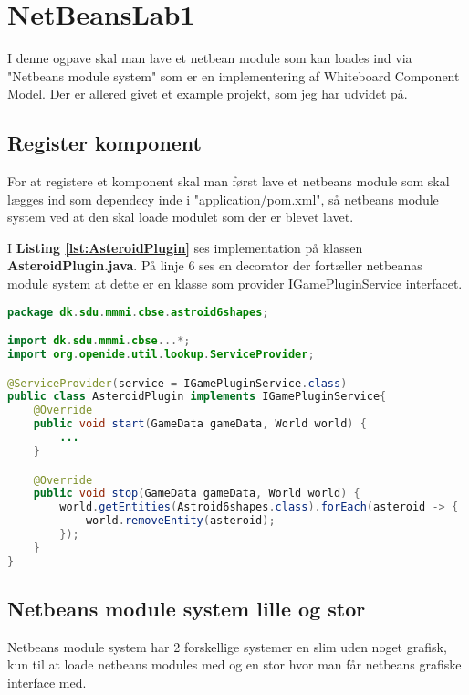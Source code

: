 \section{NetBeansLab1}
I denne ogpave skal man lave et netbean module som kan loades ind via
"Netbeans module system" som er en implementering af Whiteboard Component
Model. Der er allered givet et example projekt, som jeg har udvidet på.

\subsection{Register komponent}
For at registere et komponent skal man først lave et netbeans module som skal
lægges ind som dependecy inde i "application/pom.xml", så netbeans module
system ved at den skal loade modulet som der er blevet lavet.

\hfill \linebreak \hline 
{}
\hline \hfill \linebreak

I \textbf{Listing \ref{lst:AsteroidPlugin}} ses implementation på klassen
\textbf{AsteroidPlugin.java}. På linje 6 ses en decorator der fortæller netbeanas module 
system at dette er en klasse som provider IGamePluginService interfacet.

\begin{lstlisting}[caption={AsteroidPlugin.java}, label={lst:AsteroidPlugin}, language=java]
package dk.sdu.mmmi.cbse.astroid6shapes;

import dk.sdu.mmmi.cbse...*;
import org.openide.util.lookup.ServiceProvider;

@ServiceProvider(service = IGamePluginService.class)
public class AsteroidPlugin implements IGamePluginService{
	@Override
    public void start(GameData gameData, World world) {
        ...
    }

    @Override
    public void stop(GameData gameData, World world) {
		world.getEntities(Astroid6shapes.class).forEach(asteroid -> {
			world.removeEntity(asteroid);
		});
    }
}
\end{lstlisting}

\subsection{Netbeans module system lille og stor}
Netbeans module system har 2 forskellige systemer en slim uden noget grafisk,
kun til at loade netbeans modules med og en stor hvor man får netbeans grafiske
interface med.

